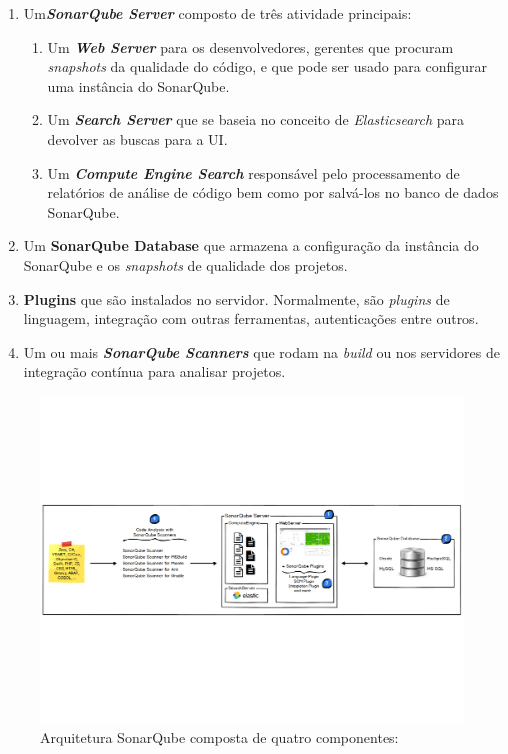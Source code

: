 \begin{enumerate}
\item Um\textbf{\textit{SonarQube Server}} composto de três atividade principais:
	\begin{enumerate}
	\item Um \textbf{\textit{Web Server}} para os desenvolvedores, gerentes que procuram \textit{snapshots} da qualidade do código, e que pode ser usado para configurar uma instância do SonarQube.
	\item Um \textbf{\textit{Search Server}} que se baseia no conceito de \textit{Elasticsearch} para devolver as buscas para a UI.
	\item Um \textbf{\textit{Compute Engine Search}} responsável pelo processamento de relatórios de análise de código bem como por salvá-los no banco de dados SonarQube.
	\end{enumerate}
\item Um \textbf{SonarQube Database} que armazena a configuração da instância do SonarQube e os \textit{snapshots} de qualidade dos projetos.
\item \textbf{Plugins} que são instalados no servidor. Normalmente, são \textit{plugins} de linguagem, integração com outras ferramentas, autenticações entre outros.
\item Um ou mais \textbf{\textit{SonarQube Scanners}} que rodam na \textit{build} ou nos servidores de integração contínua para analisar projetos.
\end{enumerate}
\graphicspath{{figuras/}}
\begin{figure}[h]
\centering
\includegraphics[scale=0.5]{Arq_Sonar}
\caption{Arquitetura SonarQube composta de quatro componentes: \cite{sonar}}
\label{img:arq_sonar}
\end{figure}


